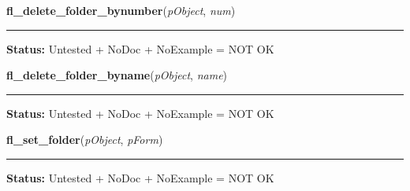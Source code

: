     \vspace{0.5ex}

\hspace{.8\funcindent}\begin{boxedminipage}{\funcwidth}

    \raggedright \textbf{fl\_delete\_folder\_bynumber}(\textit{pObject}, \textit{num})

    \vspace{-1.5ex}

    \rule{\textwidth}{0.5\fboxrule}
\setlength{\parskip}{2ex}
\setlength{\parskip}{1ex}
\textbf{Status:} Untested + NoDoc + NoExample = NOT OK



    \end{boxedminipage}

    \label{xformslib:library:fl_delete_folder_byname}

    \vspace{0.5ex}

\hspace{.8\funcindent}\begin{boxedminipage}{\funcwidth}

    \raggedright \textbf{fl\_delete\_folder\_byname}(\textit{pObject}, \textit{name})

    \vspace{-1.5ex}

    \rule{\textwidth}{0.5\fboxrule}
\setlength{\parskip}{2ex}
\setlength{\parskip}{1ex}
\textbf{Status:} Untested + NoDoc + NoExample = NOT OK



    \end{boxedminipage}

    \label{xformslib:library:fl_set_folder}

    \vspace{0.5ex}

\hspace{.8\funcindent}\begin{boxedminipage}{\funcwidth}

    \raggedright \textbf{fl\_set\_folder}(\textit{pObject}, \textit{pForm})

    \vspace{-1.5ex}

    \rule{\textwidth}{0.5\fboxrule}
\setlength{\parskip}{2ex}
\setlength{\parskip}{1ex}
\textbf{Status:} Untested + NoDoc + NoExample = NOT OK



    \end{boxedminipage}

